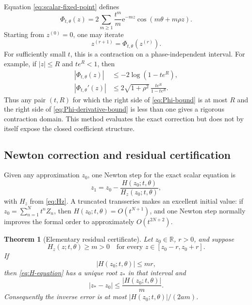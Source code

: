 \documentclass[11pt,oneside]{article}
\theoremstyle{plain}
\newtheorem{theorem}{Theorem}[section]
\theoremstyle{definition}
\theoremstyle{remark}
\newcommand{\e}{\mathrm{e}}
\newcommand{\R}{\mathbb{R}}
\newcommand{\abs}[1]{\left\lvert#1\right\rvert}
\begin{document}
Equation \eqref{eq:scalar-fixed-point} defines
\begin{equation}
 \Phi_{t,\theta}(z)=
 2\sum_{m\ge1}\frac{t^m}{m}\e^{-mz}
 \cos(m\theta+m\rho z).
 \label{eq:Phi-map}
\end{equation}
Starting from \(z^{(0)}=0\), one may iterate
\begin{equation}
 z^{(r+1)}=\Phi_{t,\theta}(z^{(r)}).
 \label{eq:fixed-point-iteration}
\end{equation}
For sufficiently small \(t\), this is a contraction on a phase-independent
interval.  For example, if \(\abs z\le R\) and \(te^R<1\), then
\begin{align}
 \abs{\Phi_{t,\theta}(z)}
 &\le -2\log(1-te^R),
 \label{eq:Phi-bound}\\
 \abs{\Phi_{t,\theta}'(z)}
 &\le 2\sqrt{1+\rho^2}\,
       \frac{te^R}{1-te^R}.
 \label{eq:Phi-derivative-bound}
\end{align}
Thus any pair \((t,R)\) for which the right side of
\eqref{eq:Phi-bound} is at most \(R\) and the right side of
\eqref{eq:Phi-derivative-bound} is less than one gives a rigorous contraction
domain.  This method evaluates the exact correction but does not by itself
expose the closed coefficient structure.

\subsection{Newton correction and residual certification}

Given any approximation \(z_0\), one Newton step for the exact scalar equation
is
\begin{equation}
 z_1=z_0-\frac{H(z_0;t,\theta)}{H_z(z_0;t,\theta)},
 \label{eq:Newton-step}
\end{equation}
with \(H_z\) from \eqref{eq:Hz}.  A truncated transseries makes an excellent
initial value: if \(z_0=\sum_{n=1}^Nt^nZ_n\), then
\(H(z_0;t,\theta)=O(t^{N+1})\), and one Newton step normally improves the
formal order to approximately \(O(t^{2N+2})\).

\begin{theorem}[Elementary residual certificate]
\label{thm:residual-certificate}
Let \(z_0\in\R\), \(r>0\), and suppose
\begin{equation}
 H_z(z;t,\theta)\ge m>0
 \quad\text{for every }z\in[z_0-r,z_0+r].
 \label{eq:certificate-derivative}
\end{equation}
If
\begin{equation}
 \abs{H(z_0;t,\theta)}\le mr,
 \label{eq:certificate-residual}
\end{equation}
then \eqref{eq:H-equation} has a unique root \(z_*\) in that interval and
\begin{equation}
 \abs{z_*-z_0}\le
 \frac{\abs{H(z_0;t,\theta)}}{m}.
 \label{eq:certificate-error}
\end{equation}
Consequently the inverse error is at most
\(\abs{H(z_0;t,\theta)}/(2am)\).
\end{theorem}
\end{document}
